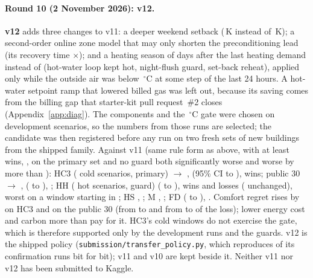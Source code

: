 \documentclass{article}
\begin{document}
\paragraph{Round 10 (2 November 2026): v12.}
\textbf{v12} adds three changes to v11: a deeper weekend setback (\RTenWkExtLo\,K instead of \RTenWkExtLoVEleven\,K);
a second-order online zone model that may only shorten the preconditioning lead (its recovery time
$\times$\RTenMprSafety); and a heating season of \RTenSeasonDays{} days after the last heating demand instead of
\RTenHeatSeasonDays{} (hot-water loop kept hot, night-flush guard, set-back reheat), applied only while the outside air
was below \RTenSeasonOatC\,$^\circ$C at some step of the last 24 hours. A hot-water setpoint ramp that lowered billed
gas was left out, because its saving comes from the billing gap that starter-kit pull request~\#2 closes
(Appendix~\ref{app:diag}). The components and the \RTenSeasonOatC\,$^\circ$C gate were chosen on development
scenarios, so the numbers from those runs are selected; the candidate was then registered before any run on two fresh
sets of \RTenNNewBuild{} new buildings from the shipped family. Against v11 (same rule form as above, with at least
\RTenRuleWins{} wins, \RTenRuleWinsPct, on the primary set and no guard both significantly worse and worse by more than
\RTenRuleMaterial): HC3 (\RTenConfHarshCThreeN{} cold scenarios, primary) \RTenConfHarshCThreeRef{} $\to$
\RTenConfHarshCThreeCand, \RTenConfHarshCThreeRel{} (95\% CI \RTenConfHarshCThreeRelLo{} to
\RTenConfHarshCThreeRelHi), \RTenConfHarshCThreeWins{} wins; public 30 \RTenConfPubRef{} $\to$ \RTenConfPubCand,
\RTenConfPubRel{} (\RTenConfPubRelLo{} to \RTenConfPubRelHi), \RTenConfPubWins; HH (\RTenConfHotHN{} hot scenarios,
guard) \RTenConfHotHRel{} (\RTenConfHotHRelLo{} to \RTenConfHotHRelHi), \RTenConfHotHWins{} wins and
\RTenConfHotHLosses{} losses (\RTenConfHotHTies{} unchanged), worst \RTenConfHotHWorstRel{} on a
\RTenConfHotHWorstStation{} window starting in \RTenConfHotHWorstMonth; HS \RTenConfHarshSRel, \RTenConfHarshSWins; M
\RTenConfMinnRel, \RTenConfMinnWins; FD \RTenConfFreshDefRel{} (\RTenConfFreshDefRelLo{} to \RTenConfFreshDefRelHi),
\RTenConfFreshDefWins. Comfort regret rises by \RTenComfRiseHCThree{} on HC3 and \RTenComfRisePub{} on the public 30
(from \RTenComfShareHCThreeRef{} to \RTenComfShareHCThreeCand{} and from \RTenComfSharePubRef{} to
\RTenComfSharePubCand{} of the loss); lower energy cost and carbon more than pay for it. HC3's cold windows do not
exercise the gate, which is therefore supported only by the development runs and the guards. v12 is the shipped policy
(\texttt{submission/transfer\_policy.py}, which reproduces \RTenXcheckN{} of its confirmation runs bit for bit); v11
and v10 are kept beside it. Neither v11 nor v12 has been submitted to Kaggle.
\end{document}

